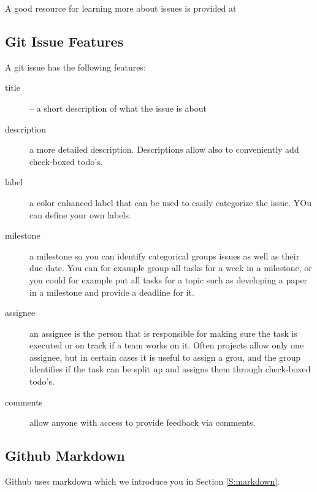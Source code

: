 
\begin{comment}
Figure ?? shows where to find the link to the git issues. An
example issue list is shown in Figure ??.
\end{comment}

A good resource for learning more about issues is provided at 


\subsection{Git Issue Features}

A git issue has the following features:

\begin{description}
\item [title] -- a short description of what the issue is about
\item [description] a more detailed description. Descriptions allow
  also to conveniently add check-boxed todo's.
\item [label] a color enhanced label that can be used to easily
  categorize the issue. YOu can define your own labels.
\item [milestone] a milestone so you can identify categorical groups
  issues as well as their due date. You can for example group all
  tasks for a week in a milestone, or you could for example put all
  tasks for a topic such as developing a paper in a milestone and
  provide a deadline for it.
\item[assignee] an assignee is the person that is responsible for
  making sure the task is executed or on track if a team works on
  it. Often projects allow only one assignee, but in certain cases it
  is useful to assign a grou, and the group identifies if the task can
  be split up and assigns them through check-boxed todo's.
\item [comments] allow anyone with access to provide feedback via
  comments.
\end{description}

\subsection{Github Markdown}

Github uses markdown which we introduce you in Section
  \ref{S:markdown}.

